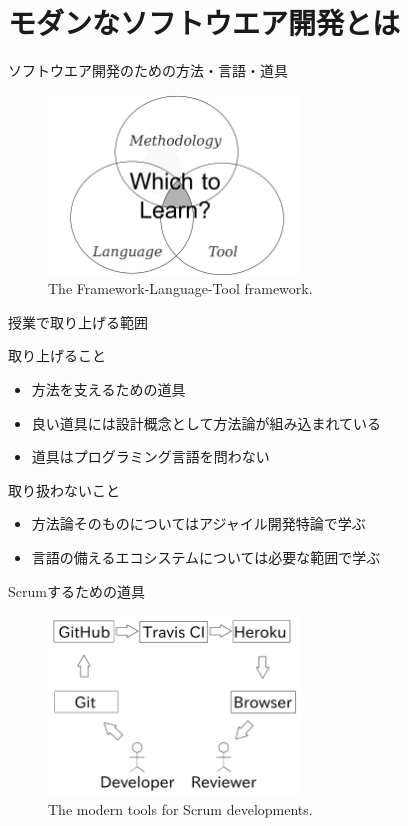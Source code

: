 \documentclass[t, aspectratio=169]{beamer}
\begin{document}
\section{モダンなソフトウエア開発とは}
\label{sec-1-4}
\begin{frame}[label=sec-1-4-1]{ソフトウエア開発のための方法・言語・道具}
\begin{figure}[htb]
\centering
\includegraphics[width=0.6\textwidth]{./figures/FLT_framework.pdf}
\caption{\label{FLT_framework}The Framework-Language-Tool framework.}
\end{figure}
\end{frame}
\begin{frame}[label=sec-1-4-2]{授業で取り上げる範囲}
\begin{block}{取り上げること}
\begin{itemize}
\item 方法を支えるための道具
\item 良い道具には設計概念として方法論が組み込まれている
\item 道具はプログラミング言語を問わない
\end{itemize}
\end{block}
\begin{block}{取り扱わないこと}
\begin{itemize}
\item 方法論そのものについてはアジャイル開発特論で学ぶ
\item 言語の備えるエコシステムについては必要な範囲で学ぶ
\end{itemize}
\end{block}
\end{frame}
\begin{frame}[label=sec-1-4-3]{Scrumするための道具}
\begin{figure}[htb]
\centering
\includegraphics[width=0.6\textwidth]{./figures/tools.pdf}
\caption{\label{tools}The modern tools for Scrum developments.}
\end{figure}
\end{frame}
\end{document}
